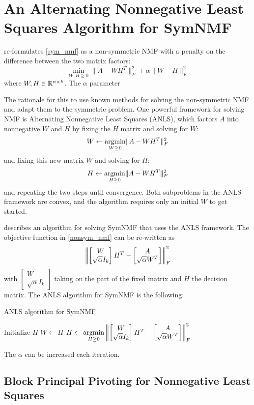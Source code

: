 \section{An Alternating Nonnegative Least Squares Algorithm for SymNMF}

\cite{Kuang:15} re-formulates \ref{sym_nmf} as a non-symmetric NMF
with a penalty on the difference between the two matrix factors:
\begin{equation} \label{nonsym_nmf}
\min_{W,H \geq 0} \|A - W H^T\|_F^2 + \alpha \|W - H\|_F^2
\end{equation}
where $W,H \in \mathbb{R}^{n \times k}$. The $\alpha$ parameter 

The rationale for this to use known methods for solving the
non-symmetric NMF and adapt them to the symmetric problem.
One powerful framework for solving NMF is Alternating Nonnegative
Least Squares (ANLS), which factors $A$ into nonnegative $W$ and $H$
by fixing the $H$ matrix and solving for $W$:
$$ W \gets \underset{W \geq 0}{\mathrm{arg min}} \|A - W H^T\|_F^2 $$
and fixing this new matrix $W$ and solving for $H$:
$$ H \gets \underset{H \geq 0}{\mathrm{arg min}} \|A - W H^T\|_F^2 $$
and repeating the two steps until convergence.
Both subproblems in the ANLS framework are convex, and the algorithm
requires only an initial $W$ to get started.

\cite{Kuang:15} describes an algorithm for solving SymNMF that uses
the ANLS framework. The objective function in \ref{nonsym_nmf} can be
re-written as
\begin{equation} \label{nls}
\left\lVert \begin{bmatrix} W \\ \sqrt{\alpha} I_k \end{bmatrix} H^T
     - \begin{bmatrix} A \\ \sqrt{\alpha} W^T \end{bmatrix} \right\rVert_F^2
\end{equation}
with $\begin{bmatrix} W \\ \sqrt{\alpha} I_k \end{bmatrix}$ taking on
the part of the fixed matrix and $H$ the decision matrix. The ANLS
algorithm for SymNMF is the following:

\begin{algorithm}
\caption{ANLS algorithm for SymNMF}
\begin{algorithmic}[1]
\State Initialize $H$
\Repeat
  \State $W \gets H$
  \State $H \gets \underset{H \geq 0}{\mathrm{arg min}}
    \left\lVert \begin{bmatrix} W \\ \sqrt{\alpha} I_k \end{bmatrix} H^T
         - \begin{bmatrix} A \\ \sqrt{\alpha} W^T \end{bmatrix} \right\rVert_F^2$
\end{algorithmic}  
\end{algorithm}

The $\alpha$ can be increased each iteration.

\subsection{Block Principal Pivoting for Nonnegative Least Squares}
\cite{Kim:11}
